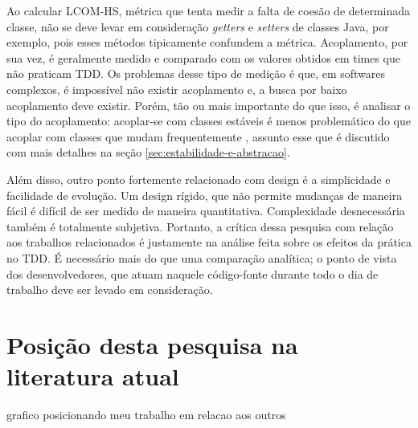 Ao calcular LCOM-HS, métrica que tenta medir a falta de coesão de determinada
classe, não se deve levar em consideração \textit{getters} e \textit{setters} de
classes Java, por exemplo, pois esses métodos tipicamente confundem a métrica.
Acoplamento, por sua vez, é geralmente medido e comparado com os valores
obtidos em times que não praticam TDD. Os problemas desse tipo de medição é que,
em softwares complexos, é impossível não existir acoplamento e, a busca por
baixo acoplamento deve existir. Porém, tão ou mais importante do que isso, é
analisar o tipo do acoplamento: acoplar-se com classes estáveis é menos
problemático do que acoplar com classes que mudam frequentemente
\cite{bob-martin}, assunto esse que é discutido com mais detalhes na seção
\ref{sec:estabilidade-e-abstracao}. 

Além disso, outro ponto fortemente relacionado com design é a simplicidade e
facilidade de evolução. Um design rígido, que não permite mudanças de maneira
fácil é difícil de ser medido de maneira quantitativa. Complexidade
desnecessária também é totalmente subjetiva. Portanto, a crítica dessa pesquisa
com relação aos trabalhos relacionados é justamente na análise feita sobre os
efeitos da prática no TDD. É necessário mais do que uma comparação analítica; o
ponto de vista dos desenvolvedores, que atuam naquele código-fonte durante todo
o dia de trabalho deve ser levado em consideração.

\section{Posição desta pesquisa na literatura atual}

grafico posicionando meu trabalho em relacao aos outros
